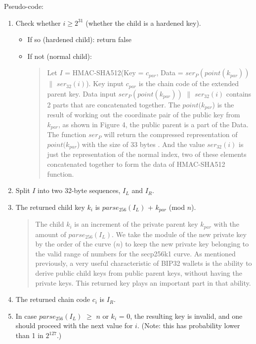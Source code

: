 Pseudo-code:
\begin{enumerate}
    \item Check whether $i \geq 2^{31}$ (whether the child is a hardened key).
          \begin{itemize}
              \item If so (hardened child): return false

              \item If not (normal child):
                    \begin{quote}

                        Let $I$ = HMAC-SHA512(Key = $c_{par}$, Data = $ser_P(point(k_{par}))$ $\parallel$ $ser_{32}(i)$).
                        Key input $c_{par}$ is the chain code of the extended parent key. Data input $ser_P(point(k_{par}))$ $\parallel$ $ser_{32}(i)$ contains 2 parts that are concatenated together. The $point(k_{par}$) is the result of working out the coordinate pair of the public key from $k_{par}$, as shown in Figure 4, the public parent is a part of the Data. The function $ser_{P}$ will return the compressed representation of $point(k_{par}$) with the size of 33 bytes \cite{secp256k1}. And the value $ser_{32}(i)$ is just the representation of the normal index, two of these elements concatenated together to form the data of HMAC-SHA512 function.
                    \end{quote}

          \end{itemize}
          \bigskip

    \item Split $I$ into two 32-byte sequences, $I_L$ and $I_R$.
          \bigskip

    \item The returned child key $k_i$ is $parse_{256}(I_L)$ + $k_{par}$ (mod $n$).

          \begin{quote}
              The child $k_i$ is an increment of the private parent key $k_{par}$ with the amount of $parse_{256}(I_L)$. We take the module of the new private key by the order of the curve ($n$) to keep the new private key belonging to the valid range of numbers for the secp256k1 curve. As mentioned previously, a very useful characteristic of BIP32 wallets is the ability to derive public child keys from public parent keys, without having the private keys. This returned key plays an important part in that ability.
          \end{quote}
          \bigskip

    \item The returned chain code $c_i$ is $I_R$.
          \bigskip

    \item In case $parse_{256}(I_L)$ $\geq$ $n$ or $k_i$ = 0, the resulting key is invalid, and one should proceed with the next value for $i$. (Note: this has probability lower than 1 in $2^{127}$.)

\end{enumerate}

